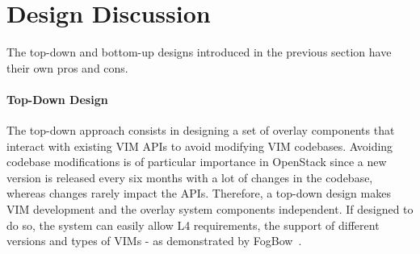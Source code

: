 
\section{Design Discussion}
\label{sec:design_discussion}

The top-down and bottom-up designs introduced in the previous section have 
their own pros and cons. 

\paragraph{Top-Down Design}
The top-down approach consists in designing a set of overlay components that
interact with existing VIM APIs to avoid modifying VIM codebases.
Avoiding codebase modifications is of particular importance in OpenStack since
a new version is released every six months with a lot of changes in the
codebase, whereas changes rarely impact the APIs. Therefore, a top-down design
makes VIM development and the overlay system components independent. If
designed to do so, the system can easily allow L4 requirements, \ie the
support of different versions and types of VIMs - as demonstrated by 
FogBow~\cite{brasileiro2016fogbow}.

